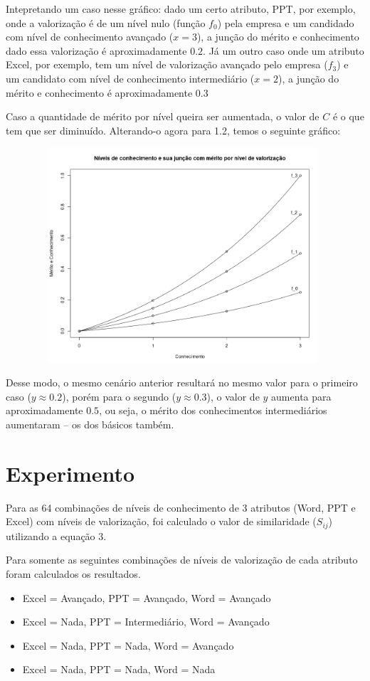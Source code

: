 \documentclass[]{article}
\begin{document}
	Intepretando um caso nesse gráfico: dado um certo atributo, PPT, por exemplo, onde a valorização é de um nível nulo (função $f_0$) pela empresa e um candidado com nível de conhecimento avançado ($x = 3$), a junção do mérito e conhecimento dado essa valorização é aproximadamente $0.2$. Já um outro caso onde um atributo Excel, por exemplo, tem um nível de valorização avançado pelo empresa ($f_3$) e um candidato com nível de conhecimento intermediário ($x = 2$), a junção do mérito e conhecimento é aproximadamente $0.3$
	
	Caso a quantidade de mérito por nível queira ser aumentada, o valor de $C$ é o que tem que ser diminuído. Alterando-o agora para 1.2, temos o seguinte gráfico:
	
	\includegraphics[width=13.2cm, height=8cm]{plot-2}
	
	Desse modo, o mesmo cenário anterior resultará no mesmo valor para o primeiro caso ($y \approx 0.2$), porém para o segundo ($y \approx 0.3$), o valor de $y$ aumenta para aproximadamente $0.5$, ou seja, o mérito dos conhecimentos intermediários aumentaram -- os dos básicos também.
	
	\section{Experimento}
	
	Para as 64 combinações de níveis de conhecimento de 3 atributos (Word, PPT e Excel) com níveis de valorização, foi calculado o valor de similaridade ($S_{ij}$) utilizando a equação 3.
	
	Para somente as seguintes combinações de níveis de valorização de cada atributo foram calculados os resultados.
	
	\begin{itemize}
		\item Excel = Avançado, PPT = Avançado, Word = Avançado
		\item Excel = Nada, PPT = Intermediário, Word = Avançado
		\item Excel = Nada, PPT = Nada, Word = Avançado
		\item Excel = Nada, PPT = Nada, Word = Nada
	\end{itemize}
	
\end{document}
